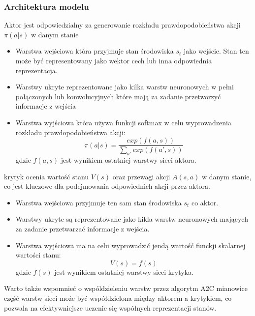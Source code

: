 \documentclass[a4paper, 12pt]{article}
\begin{document}
    \subsubsection{Architektura modelu}
    Aktor jest odpowiedzialny za generowanie rozkładu prawdopodobieństwa akcji \( \pi(a|s) \)
    w danym stanie 
    \begin{itemize}
        \item Warstwa wejściowa która przyjmuje stan środowiska \( s_t \) jako wejście. Stan ten może być representowany jako wektor cech lub inna odpowiednia reprezentacja.
        \item Warstwy ukryte reprezentowane jako kilka warstw neuronowych w pełni połączonych lub konwolucyjnych które
        mają za zadanie przetworzyć informacje z wejścia
        \item Warstwa wyjściowa która używa funkcji softmax w celu wyprowadzenia rozkładu prawdopodobieństwa akcji:
        \[ \pi(a|s) = \frac{exp(f(a,s))}{\sum_{a'}exp(f(a',s))} \]
        gdzie \( f(a,s) \) jest wynikiem ostatniej warstwy sieci aktora.
    \end{itemize}
    krytyk ocenia wartość stanu \( V(s) \) oraz przewagi akcji \( A(s,a) \) w danym stanie, co jest kluczowe dla podejmowania odpowiednich akcji przez aktora.
    \begin{itemize}
        \item Warstwa wejściowa przyjmuje ten sam stan środowiska \( s_t \) co aktor.
        \item Warstwy ukryte są reprezentowane jako kikla warstw neuronowych mających za zadanie przetwarzać informacje z wejścia.
        \item Warstwa wyjściowa ma na celu wyprowadzić jendą wartość funckji skalarnej wartości stanu:
        \[ V(s) = f(s) \]
        gdzie \( f(s) \) jest wynikiem ostatniej warstwy sieci krytyka.
    \end{itemize}
    Warto także wspomnieć o wspóldzieleniu warstw przez algorytm A2C mianowice część warstw sieci może być współdzielona między
    aktorem a krytykiem, co pozwala na efektywniejsze uczenie się współnych reprezentacji stanów.
\end{document}
